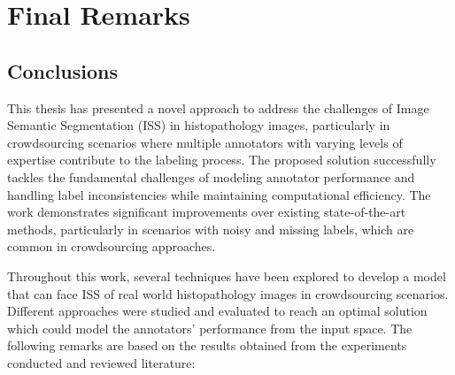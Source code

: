 \chapter{Final Remarks}\label{ch:final_remarks}

\section{Conclusions}

This thesis has presented a novel approach to address the challenges
of Image Semantic Segmentation (ISS) in histopathology images,
particularly in crowdsourcing scenarios where multiple annotators
with varying levels of expertise contribute to the labeling process.
The proposed solution successfully tackles the fundamental challenges
of modeling annotator performance and handling label inconsistencies
while maintaining computational efficiency. The work demonstrates
significant improvements over existing state-of-the-art methods,
particularly in scenarios with noisy and missing labels, which are
common in crowdsourcing approaches.

Throughout this work, several techniques have been explored to develop a
model that can face \gls{ISS} of real world histopathology images in
crowdsourcing scenarios. Different approaches were studied and evaluated
to reach an optimal solution which could model the annotators' performance
from the input space. The following remarks are based on the results
obtained from the experiments conducted and reviewed literature:

